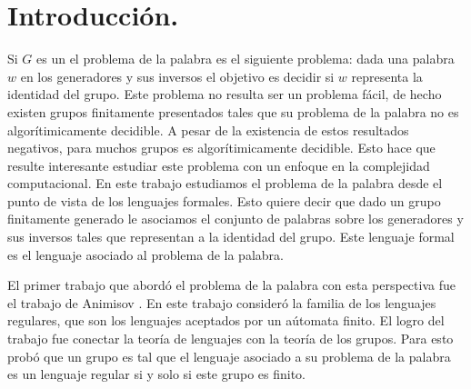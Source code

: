 \documentclass[tesis.tex]{subfiles}
\begin{document}
	\chapter*{Introducción.}
	
	Si $G$ es un \fg el problema de la palabra es el siguiente problema: dada una palabra $w$ en los generadores y sus inversos el objetivo es decidir si $w$ representa la identidad del grupo.
	Este problema no resulta ser un problema fácil, de hecho existen grupos finitamente presentados tales que su problema de la palabra no es algorítimicamente decidible.
	A pesar de la existencia de estos resultados negativos, para muchos grupos es algorítimicamente decidible.
	Esto hace que resulte interesante estudiar este problema con un enfoque en la complejidad computacional.
	En este trabajo estudiamos el problema de la palabra desde el punto de vista de los lenguajes formales.
	Esto quiere decir que dado un grupo finitamente generado le asociamos el conjunto de palabras sobre los generadores y sus inversos tales que representan a la identidad del grupo.
	Este lenguaje formal es el lenguaje asociado al problema de la palabra.


	
	El primer trabajo que abordó el problema de la palabra con esta perspectiva fue el trabajo de Animisov \cite{anisimov1971languages}. 
	En este trabajo consideró la familia de los lenguajes regulares,
	que son los lenguajes aceptados por un aútomata finito.
	El logro del trabajo fue conectar la teoría de lenguajes con la teoría de los grupos. 
	Para esto probó que un grupo es tal que el lenguaje asociado a su problema de la palabra es un lenguaje regular si y solo si este grupo es finito.
		
\end{document}
